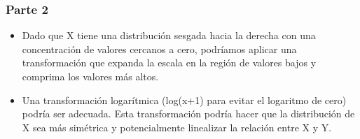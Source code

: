 \documentclass[11pt]{article}
\providecommand{\tightlist}{%
      \setlength{\itemsep}{0pt}\setlength{\parskip}{0pt}}
\begin{document}
    \subsubsection{Parte 2}\label{parte-2}

\begin{itemize}
\tightlist
\item
  Dado que X tiene una distribución sesgada hacia la derecha con una
  concentración de valores cercanos a cero, podríamos aplicar una
  transformación que expanda la escala en la región de valores bajos y
  comprima los valores más altos.
\item
  Una transformación logarítmica (log(x+1) para evitar el logaritmo de
  cero) podría ser adecuada. Esta transformación podría hacer que la
  distribución de X sea más simétrica y potencialmente linealizar la
  relación entre X y Y.
\end{itemize}
\end{document}
